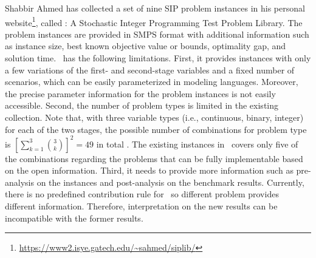 Shabbir Ahmed has collected a set of nine SIP problem instances in his personal website\footnote{\url{https://www2.isye.gatech.edu/~sahmed/siplib/}}, called \siplib: A Stochastic Integer Programming Test Problem Library. The problem instances are provided in SMPS format \cite{smps} with additional information such as instance size, best known objective value or bounds, optimality gap, and solution time. \siplib\ has the following limitations. 
First, it provides instances with only a few variations of the first- and second-stage variables and a fixed number of scenarios, which can be easily parameterized in 
modeling languages. Moreover, the precise parameter information for the problem instances is 
not easily accessible. Second, the number of problem types is limited in 
the existing collection. Note that, with three variable types (i.e., continuous, 
binary, integer) for each of the two stages, the possible number of combinations for problem type is $\left[\sum_{k=1}
^3\binom{3}{k}\right]^2=49$ in total . 
The existing instances in \siplib\ covers only five of the combinations 
regarding the problems that can be fully implementable based on the open information. 
Third, it needs to provide more information such as pre-analysis on the 
instances and post-analysis on the benchmark results. Currently, there is no predefined 
contribution rule for \siplib\ so different problem provides different information. 
Therefore, interpretation on the new results can be incompatible with the former results. 


